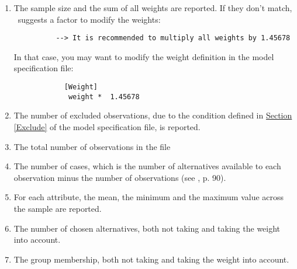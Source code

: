 \documentclass[12pt]{memoir}
\begin{document}
   \begin{enumerate}
      \item The sample size and the sum of all weights are reported. If they don't match, \BIOGEME\ suggests a factor to modify the weights:
         \small
{\footnotesize
         \begin{verbatim}
          --> It is recommended to multiply all weights by 1.45678
         \end{verbatim}
}
         \normalsize
         In that case, you may want to modify the weight definition in the model specification file:
{\footnotesize
         \begin{verbatim}
            [Weight]
             weight *  1.45678
         \end{verbatim}
}
      \item The number of excluded observations, due to the condition defined in
         \hyperlink{Exclude}{Section [Exclude]} of the model specification file, is
         reported.
      \item The total number of observations in the file
      \item The number of cases, which is the number of alternatives
           available to each observation minus the number of observations 
           (see \cite{BenALerm85}, p. 90). 
      \item For each attribute, the mean,
         the minimum and the maximum 
         value across the sample are reported. 
      \item The number of chosen alternatives, both not taking and taking the weight into account.
      \item The group membership,  both not taking and taking the weight into account.
   \end{enumerate}

\end{document}
